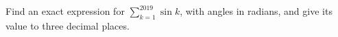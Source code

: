 Find an exact expression for $\sum_{k=1}^{2019}\sin k$, with angles in radians, and give its value to three decimal places.
